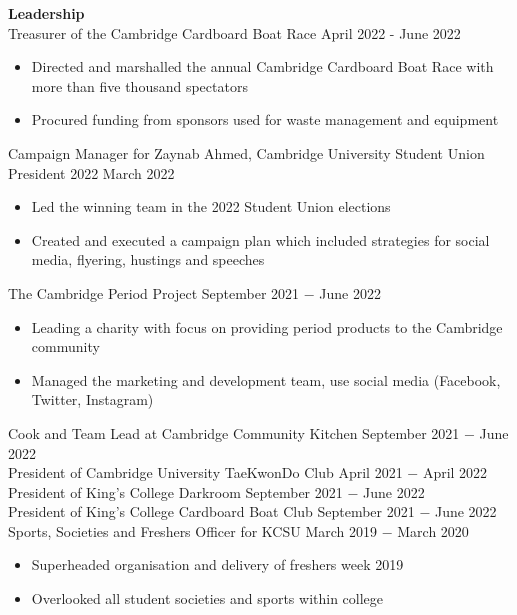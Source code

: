\documentclass{article}
\begin{document}
\textbf{Leadership}\\
Treasurer of the Cambridge Cardboard Boat Race \hfill April 2022 - June 2022
\begin{itemize}
    \item Directed and marshalled the annual Cambridge Cardboard Boat Race with more than five thousand spectators
    \item Procured funding from sponsors used for waste management and equipment
\end{itemize}
Campaign Manager for Zaynab Ahmed, Cambridge University Student Union President 2022 \hfill March 2022 
\begin{itemize}
    \item Led the winning team in the 2022 Student Union elections
    \item Created and executed a campaign plan which included strategies for social media, flyering, hustings and speeches
\end{itemize}
The Cambridge Period Project \hfill  September 2021 $-$  June 2022
\begin{itemize}
    \item Leading a charity with focus on providing period products to the Cambridge community
    \item Managed the marketing and development team, use social media (Facebook, Twitter, Instagram)
\end{itemize}
Cook and Team Lead at Cambridge Community Kitchen \hfill September 2021 $-$ June 2022\\
President of Cambridge University TaeKwonDo Club \hfill April 2021 $-$ April 2022\\
President of King's College Darkroom \hfill September 2021 $-$ June 2022 \\ 
President of King's College Cardboard Boat Club \hfill September 2021 $-$ June 2022 \\
Sports, Societies and Freshers Officer for KCSU \hfill March 2019 $-$ March 2020
\begin{itemize}
    \item Superheaded organisation and delivery of freshers week 2019
    \item Overlooked all student societies and sports within college
\end{itemize} \medskip
\end{document}
